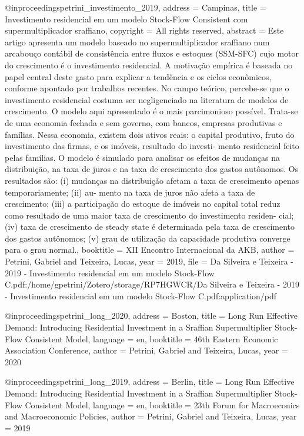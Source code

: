 @inproceedings{petrini_investimento_2019,
  address = {Campinas},
  title = {Investimento residencial em um modelo {Stock}-{Flow} {Consistent} com supermultiplicador sraffiano},
  copyright = {All rights reserved},
  abstract = {Este artigo apresenta um modelo baseado no supermultiplicador sraffiano num arcabouço contábil
   de consistência entre fluxos e estoques (SSM-SFC) cujo motor do crescimento é o investimento
   residencial. A motivação empírica é baseada no papel central deste gasto para explicar a tendência
   e os ciclos econômicos, conforme apontado por trabalhos recentes. No campo teórico, percebe-se
   que o investimento residencial costuma ser negligenciado na literatura de modelos de crescimento.
   O modelo aqui apresentado é o mais parcimonioso possível. Trata-se de uma economia fechada e
   sem governo, com bancos, empresas produtivas e famílias. Nessa economia, existem dois ativos
   reais: o capital produtivo, fruto do investimento das firmas, e os imóveis, resultado do investi-
   mento residencial feito pelas famílias. O modelo é simulado para analisar os efeitos de mudanças
   na distribuição, na taxa de juros e na taxa de crescimento dos gastos autônomos. Os resultados
   são: (i) mudanças na distribuição afetam a taxa de crescimento apenas temporariamente; (ii) au-
   mento na taxa de juros não afeta a taxa de crescimento; (iii) a participação do estoque de imóveis
   no capital total reduz como resultado de uma maior taxa de crescimento do investimento residen-
   cial; (iv) taxa de crescimento de steady state é determinada pela taxa de crescimento dos gastos
   autônomos; (v) grau de utilização da capacidade produtiva converge para o grau normal.},
  booktitle = {{XII} {Encontro} {Internacional} da {AKB}},
  author = {Petrini, Gabriel and Teixeira, Lucas},
  year = {2019},
  file = {Da Silveira e Teixeira - 2019 - Investimento residencial em um modelo Stock-Flow C.pdf:/home/gpetrini/Zotero/storage/RP7HGWCR/Da Silveira e Teixeira - 2019 - Investimento residencial em um modelo Stock-Flow C.pdf:application/pdf}
 }
 
 @inproceedings{petrini_long_2020,
  address = {Boston},
  title = {Long {Run} {Effective} {Demand}: {Introducing} {Residential} {Investment} in a {Sraffian} {Supermultiplier} {Stock}-{Flow} {Consistent} {Model}},
  language = {en},
  booktitle = {46th {Eastern} {Economic} {Association} {Conference}},
  author = {Petrini, Gabriel and Teixeira, Lucas},
  year = {2020}
 }
 
 @inproceedings{petrini_long_2019,
  address = {Berlin},
  title = {Long {Run} {Effective} {Demand}: {Introducing} {Residential} {Investment} in a {Sraffian} {Supermultiplier} {Stock}-{Flow} {Consistent} {Model}},
  language = {en},
  booktitle = {23th {Forum} for {Macroeconics} and {Macroeconomic} {Policies}},
  author = {Petrini, Gabriel and Teixeira, Lucas},
  year = {2019}
 }
